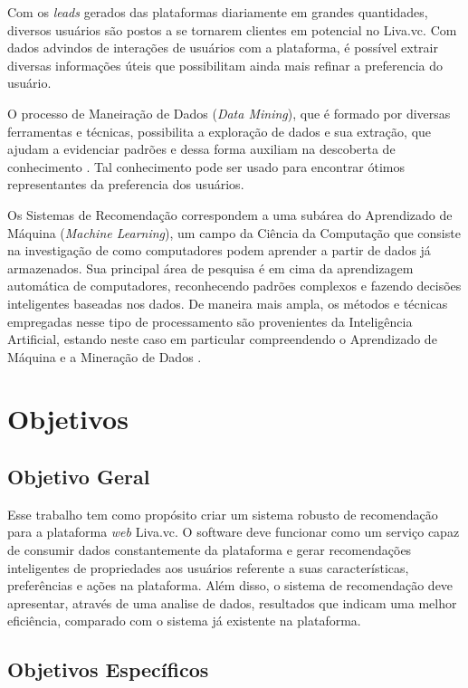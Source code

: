 Com os \textit{leads} gerados das plataformas diariamente em grandes quantidades, diversos usuários são postos a se tornarem clientes em potencial no Liva.vc. Com dados advindos de interações de usuários com a plataforma, é possível extrair diversas informações úteis que possibilitam ainda mais refinar a preferencia do usuário.

O processo de Maneiração de Dados (\textit{Data Mining}), que é formado por diversas ferramentas e técnicas, possibilita a exploração de dados e sua extração, que ajudam a evidenciar padrões e dessa forma auxiliam na descoberta de conhecimento \cite{Han:2011:DMC:1972541}. Tal conhecimento pode ser usado para encontrar ótimos representantes da preferencia dos usuários.

Os Sistemas de Recomendação correspondem a uma subárea do Aprendizado de Máquina (\textit{Machine Learning}), um campo da Ciência da Computação que consiste na investigação de como computadores podem aprender a partir de dados já armazenados. Sua principal área de pesquisa é em cima da aprendizagem automática de computadores, reconhecendo padrões complexos e fazendo decisões inteligentes baseadas nos dados. De maneira mais ampla, os métodos e técnicas empregadas nesse tipo de processamento são provenientes da Inteligência Artificial, estando neste caso em particular compreendendo o Aprendizado de Máquina e a Mineração de Dados \cite{Han:2011:DMC:1972541}.

\section{Objetivos}


\subsection{Objetivo Geral}
Esse trabalho tem como propósito criar um sistema robusto de recomendação para a plataforma \textit{web} Liva.vc. O software deve funcionar como um serviço capaz de consumir dados constantemente da plataforma e gerar recomendações inteligentes de propriedades aos usuários referente a suas características, preferências e ações na plataforma. Além disso, o sistema de recomendação deve apresentar, através de uma analise de dados, resultados que indicam uma melhor eficiência, comparado com o sistema já existente na plataforma.

\subsection{Objetivos Específicos}

